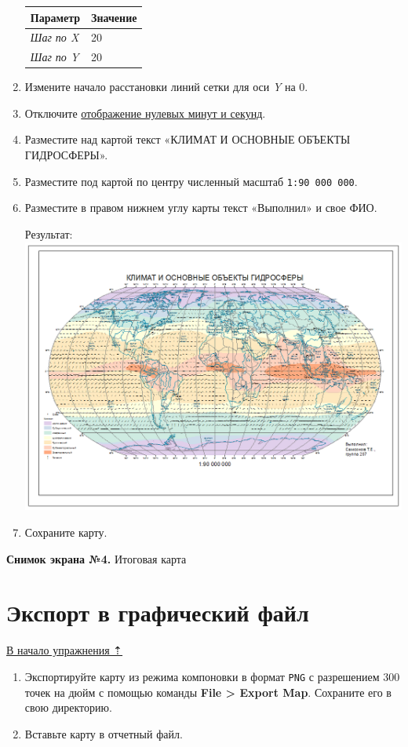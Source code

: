\documentclass[]{book}
\theoremstyle{definition}
\theoremstyle{definition}
\theoremstyle{definition}
\theoremstyle{remark}
\begin{document}
\begin{enumerate}
  \begin{longtable}[]{@{}ll@{}}
  \toprule
  \textbf{Параметр} & \textbf{Значение}\tabularnewline
  \midrule
  \endhead
  \emph{Шаг по X} & 20\tabularnewline
  \emph{Шаг по Y} & 20\tabularnewline
  \bottomrule
  \end{longtable}
\item
  Измените начало расстановки линий сетки для оси \emph{Y} на 0.
\item
  Отключите
  \protect\hyperlink{manual-projections-zero-degrees}{отображение
  нулевых минут и секунд}.
\item
  Разместите над картой текст «КЛИМАТ И ОСНОВНЫЕ ОБЪЕКТЫ ГИДРОСФЕРЫ».
\item
  Разместите под картой по центру численный масштаб
  \texttt{1:90\ 000\ 000}.
\item
  Разместите в правом нижнем углу карты текст «Выполнил» и свое ФИО.

  Результат: \includegraphics{images/Ex03/image35.png}
\item
  Сохраните карту.
\end{enumerate}

\textbf{Снимок экрана №4.} Итоговая карта

\hypertarget{map-design-climates-export}{%
\section{Экспорт в графический файл}\label{map-design-climates-export}}

\protect\hyperlink{map-design-climates}{В начало упражнения ⇡}

\begin{enumerate}
\def\labelenumi{\arabic{enumi}.}
\item
  Экспортируйте карту из режима компоновки в формат \texttt{PNG} с
  разрешением 300 точек на дюйм с помощью команды \textbf{File
  \textgreater{} Export Map}. Сохраните его в свою директорию.
\item
  Вставьте карту в отчетный файл.
\end{enumerate}
\end{document}
